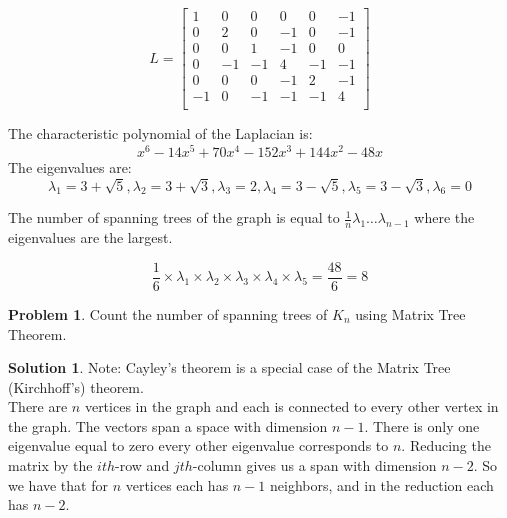 \documentclass[10pt]{article}
\theoremstyle{plain}
\theoremstyle{definition}
\newtheorem{prob}{Problem}
\newtheorem*{sol}{Solution}
\theoremstyle{remark}
\begin{document}
\medskip

\[L =
\begin{bmatrix}
1 & 0 & 0 & 0 & 0 & -1 \\
0 & 2 & 0 & -1 & 0 & -1 \\
0 & 0 & 1 & -1 & 0 & 0 \\
0 & -1 & -1 & 4 & -1 & -1 \\
0 & 0 & 0 & -1 & 2 & -1 \\
-1 & 0 & -1 & -1 & -1 & 4 \\
\end{bmatrix}
\]

The characteristic polynomial of the Laplacian is: \[x^6 - 14x^5 + 70x^4 -152x^3 + 144x^2 - 48x \]
The eigenvalues are: \[ \lambda_1 = 3 + \sqrt{5}, \lambda_2 = 3 + \sqrt{3}, \lambda_3 = 2, \lambda_4 = 3 - \sqrt{5}, \lambda_5 = 3 - \sqrt{3}, \lambda_6 = 0 \]

The number of spanning trees of the graph is equal to $\frac{1}{n} \lambda_1 \ldots \lambda_{n-1}$ where the eigenvalues are the largest.

\[ \frac{1}{6} \times \lambda_1 \times \lambda_2 \times \lambda_3 \times \lambda_4 \times \lambda_5 = \frac{48}{6} = 8 \]

\pagebreak

\begin{prob}
Count the number of spanning trees of $K_n$ using Matrix Tree Theorem.
\end{prob}

\medskip

\begin{sol}
Note: Cayley's theorem is a special case of the Matrix Tree (Kirchhoff's) theorem. \\

There are $n$ vertices in the graph and each is connected to every other vertex in the graph. The vectors span a space with dimension $n - 1$. There is only one eigenvalue equal to zero every other eigenvalue corresponds to $n$. Reducing the matrix by the $ith$-row and $jth$-column gives us a span with dimension $n - 2$. So we have that for $n$ vertices each has $n-1$ neighbors, and in the reduction each has $n-2$.

\end{sol}
\pagebreak
\end{document}
